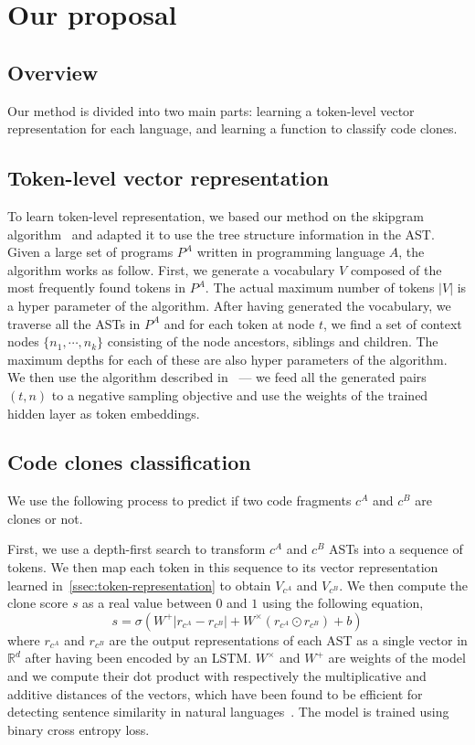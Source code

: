 \documentclass[11pt,a4paper,twocolumn]{article}
\begin{document}
\section{Our proposal}
\subsection{Overview}
Our method is divided into two main parts: learning a token-level vector
representation for each language, and learning a function to classify
code clones.
\subsection{\label{ssec:token-representation}Token-level vector representation}
To learn token-level representation, we based our method on the skipgram
algorithm~\cite{DBLP:journals/corr/abs-1301-3781} and adapted it to
use the tree structure information in the AST.
Given a large set of programs $P^A$ written in programming language $A$,
the algorithm works as follow.
First, we generate a vocabulary $V$ composed of the most frequently found tokens in
$P^A$. The actual maximum number of tokens $|V|$ is a hyper parameter of the algorithm.
After having generated the vocabulary, we traverse all the ASTs in $P^A$ and for
each token at node $t$, we find a set of context nodes $\{n_1,\cdots,n_k\}$
consisting of the node ancestors, siblings and children. The maximum depths
for each of these are also hyper parameters of the algorithm.
We then use the algorithm described in~\cite{DBLP:journals/corr/abs-1301-3781}
--- we feed all the generated pairs $(t, n)$ to a negative sampling objective
and use the weights of the trained hidden layer as token embeddings.
\subsection{\label{ssec:code-clones}Code clones classification}
We use the following process to predict if two code fragments $c^A$ and $c^B$ are clones or not.

First, we use a depth-first search to transform $c^A$ and $c^B$ ASTs into a
sequence of tokens. We then map each token in this sequence to its vector
representation learned in~\ref{ssec:token-representation} to obtain $V_{c^A}$
and $V_{c^B}$.
We then compute the clone score $s$ as a real value between $0$ and $1$ using the
following equation,
\begin{equation}
  s = \sigma\left( W^{+} \left| r_{c^A} - r_{c^B} \right| + W^{\times} \left(
      r_{c^A} \odot  r_{c^B} \right) + b  \right)
\end{equation}
where $r_{c^A}$ and $r_{c^B}$ are the output representations of each AST as a
single vector in $\mathbb{R}^d$ after having been encoded by an LSTM.
$W^{\times}$ and $W^{+}$ are weights of the model and we compute their dot
product with respectively the multiplicative and additive
distances of the vectors, which have been found to be efficient for detecting
sentence similarity in natural languages~\cite{DBLP:journals/corr/TaiSM15}.
The model is trained using binary cross entropy loss.
\end{document}

